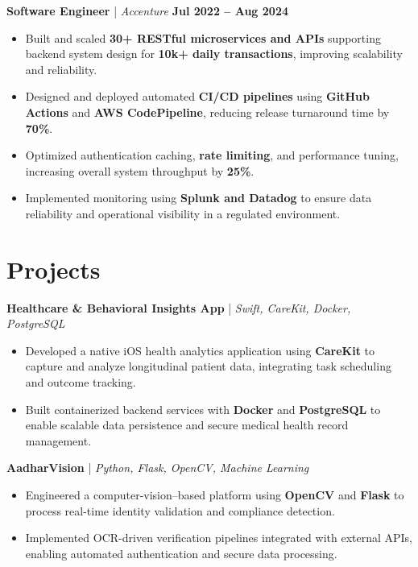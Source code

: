 \documentclass[letterpaper,11pt]{article}
\begin{document}
\textbf{Software Engineer} \;|\; \textit{Accenture} \hfill \textbf{Jul 2022 -- Aug 2024} \\
\begin{itemize}[noitemsep]
    \item Built and scaled \textbf{30+ RESTful microservices and APIs} supporting backend system design for \textbf{10k+ daily transactions}, improving scalability and reliability.
    \item Designed and deployed automated \textbf{CI/CD pipelines} using \textbf{GitHub Actions} and \textbf{AWS CodePipeline}, reducing release turnaround time by \textbf{70\%}.
    \item Optimized authentication caching, \textbf{rate limiting}, and performance tuning, increasing overall system throughput by \textbf{25\%}.
    \item Implemented monitoring using \textbf{Splunk and Datadog} to ensure data reliability and operational visibility in a regulated environment.
\end{itemize}

\section*{Projects}
\textbf{Healthcare \& Behavioral Insights App} \;|\; \textit{Swift, CareKit, Docker, PostgreSQL} \\
\begin{itemize}[noitemsep]
    \item Developed a native iOS health analytics application using \textbf{CareKit} to capture and analyze longitudinal patient data, integrating task scheduling and outcome tracking.
    \item Built containerized backend services with \textbf{Docker} and \textbf{PostgreSQL} to enable scalable data persistence and secure medical health record management.
\end{itemize}

\textbf{AadharVision} \;|\; \textit{Python, Flask, OpenCV, Machine Learning} \\
\begin{itemize}[noitemsep]
    \item Engineered a computer-vision–based platform using \textbf{OpenCV} and \textbf{Flask} to process real-time identity validation and compliance detection.
    \item Implemented OCR-driven verification pipelines integrated with external APIs, enabling automated authentication and secure data processing.
\end{itemize}
\end{document}
